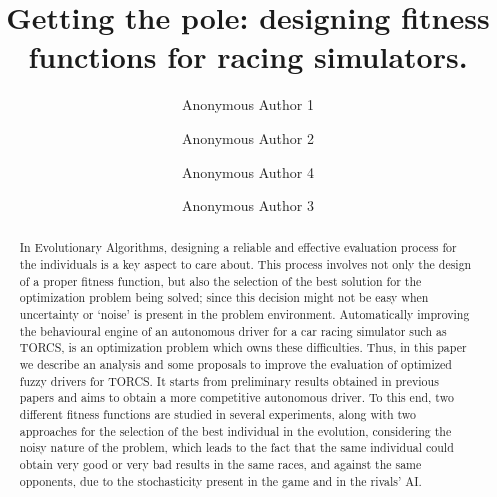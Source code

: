 \documentclass[sigconf]{acmart}
\begin{document}
\title{Getting the pole: designing fitness functions for racing simulators.}

\author{Anonymous Author 1}

\author{Anonymous Author 2}

\author{Anonymous Author 4}

\author{Anonymous Author 3}

\renewcommand{\shortauthors}{A. Author et al.}


\begin{abstract}
	
In Evolutionary Algorithms, designing a reliable and effective evaluation process for the individuals is a key aspect to care about. This process involves not only the design of a proper fitness function, but also the selection of the best solution for the optimization problem being solved; since this decision might not be easy when uncertainty or `noise' is present in the problem environment.
Automatically improving the behavioural engine of an autonomous driver for a car racing simulator such as TORCS, is an optimization problem which owns these difficulties. 
Thus, in this paper we describe an analysis and some proposals to improve the evaluation of optimized fuzzy drivers for TORCS. It starts from preliminary results obtained in previous papers and aims to obtain a more competitive autonomous driver.
To this end, two different fitness functions are studied in several experiments, along with two  
approaches for the selection of the best individual in the evolution, considering the noisy nature of the problem, which leads to the fact that the same individual could obtain very good or very bad results in the same races, and against the same opponents, due to the stochasticity present in the game and in the rivals' AI.
\end{abstract}
\end{document}
